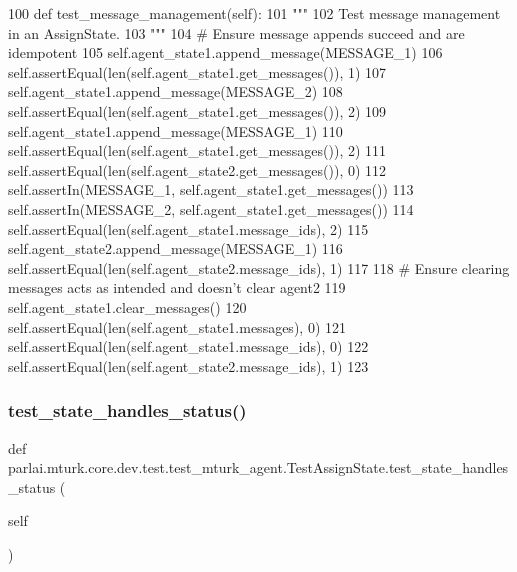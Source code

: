 \begin{DoxyCode}
100     \textcolor{keyword}{def }test\_message\_management(self):
101         \textcolor{stringliteral}{"""}
102 \textcolor{stringliteral}{        Test message management in an AssignState.}
103 \textcolor{stringliteral}{        """}
104         \textcolor{comment}{# Ensure message appends succeed and are idempotent}
105         self.agent\_state1.append\_message(MESSAGE\_1)
106         self.assertEqual(len(self.agent\_state1.get\_messages()), 1)
107         self.agent\_state1.append\_message(MESSAGE\_2)
108         self.assertEqual(len(self.agent\_state1.get\_messages()), 2)
109         self.agent\_state1.append\_message(MESSAGE\_1)
110         self.assertEqual(len(self.agent\_state1.get\_messages()), 2)
111         self.assertEqual(len(self.agent\_state2.get\_messages()), 0)
112         self.assertIn(MESSAGE\_1, self.agent\_state1.get\_messages())
113         self.assertIn(MESSAGE\_2, self.agent\_state1.get\_messages())
114         self.assertEqual(len(self.agent\_state1.message\_ids), 2)
115         self.agent\_state2.append\_message(MESSAGE\_1)
116         self.assertEqual(len(self.agent\_state2.message\_ids), 1)
117 
118         \textcolor{comment}{# Ensure clearing messages acts as intended and doesn't clear agent2}
119         self.agent\_state1.clear\_messages()
120         self.assertEqual(len(self.agent\_state1.messages), 0)
121         self.assertEqual(len(self.agent\_state1.message\_ids), 0)
122         self.assertEqual(len(self.agent\_state2.message\_ids), 1)
123 
\end{DoxyCode}
\mbox{\label{classparlai_1_1mturk_1_1core_1_1dev_1_1test_1_1test__mturk__agent_1_1TestAssignState_ab2f45c29a3bbe4b97ee51030e195ea30}} 
\subsubsection{\texorpdfstring{test\+\_\+state\+\_\+handles\+\_\+status()}{test\_state\_handles\_status()}}
{\footnotesize\ttfamily def parlai.\+mturk.\+core.\+dev.\+test.\+test\+\_\+mturk\+\_\+agent.\+Test\+Assign\+State.\+test\+\_\+state\+\_\+handles\+\_\+status (\begin{DoxyParamCaption}\item[{}]{self }\end{DoxyParamCaption})}


